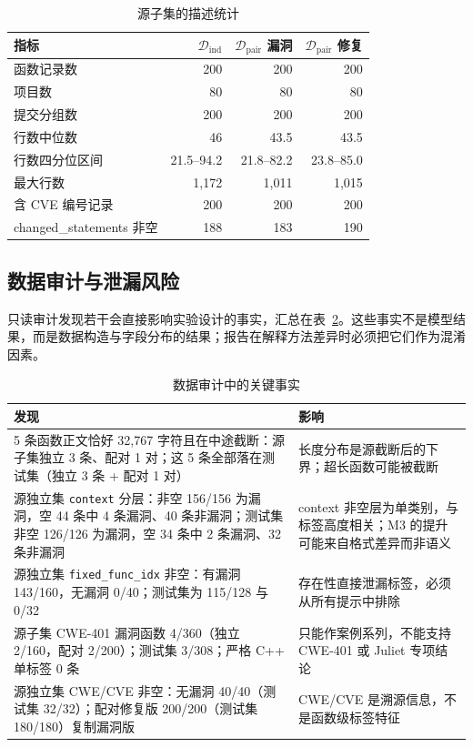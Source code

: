 \documentclass[conference]{IEEEtran}
\newcommand{\Dind}{\mathcal{D}_{\mathrm{ind}}}
\newcommand{\Dpair}{\mathcal{D}_{\mathrm{pair}}}
\begin{document}
\begin{table}[t]
\caption{源子集的描述统计}
\label{tab:data-stats}
\centering
\scriptsize
\begin{tabular}{@{}lrrr@{}}
\toprule
指标 & $\Dind$ & $\Dpair$ 漏洞 & $\Dpair$ 修复\\
\midrule
函数记录数 & 200 & 200 & 200\\
项目数 & 80 & 80 & 80\\
提交分组数 & 200 & 200 & 200\\
行数中位数 & 46 & 43.5 & 43.5\\
行数四分位区间 & 21.5--94.2 & 21.8--82.2 & 23.8--85.0\\
最大行数 & 1{,}172 & 1{,}011 & 1{,}015\\
含 CVE 编号记录 & 200 & 200 & 200\\
changed\_statements 非空 & 188 & 183 & 190\\
\bottomrule
\end{tabular}
\end{table}

\subsection{数据审计与泄漏风险}
只读审计发现若干会直接影响实验设计的事实，汇总在表~\ref{tab:audit}。这些事实不是模型结果，而是数据构造与字段分布的结果；报告在解释方法差异时必须把它们作为混淆因素。

\begin{table}[t]
\caption{数据审计中的关键事实}
\label{tab:audit}
\centering
\small
\begin{tabular}{@{}p{4.6cm}p{3.2cm}@{}}
\toprule
发现 & 影响\\
\midrule
5 条函数正文恰好 32{,}767 字符且在中途截断：源子集独立 3 条、配对 1 对；这 5 条全部落在测试集（独立 3 条 + 配对 1 对） & 长度分布是源截断后的下界；超长函数可能被截断 \\
源独立集 \texttt{context} 分层：非空 156/156 为漏洞，空 44 条中 4 条漏洞、40 条非漏洞；测试集非空 126/126 为漏洞，空 34 条中 2 条漏洞、32 条非漏洞 & context 非空层为单类别，与标签高度相关；M3 的提升可能来自格式差异而非语义 \\
源独立集 \texttt{fixed\_func\_idx} 非空：有漏洞 143/160，无漏洞 0/40；测试集为 115/128 与 0/32 & 存在性直接泄漏标签，必须从所有提示中排除 \\
源子集 CWE-401 漏洞函数 4/360（独立 2/160，配对 2/200）；测试集 3/308；严格 C++ 单标签 0 条 & 只能作案例系列，不能支持 CWE-401 或 Juliet 专项结论 \\
源独立集 CWE/CVE 非空：无漏洞 40/40（测试集 32/32）；配对修复版 200/200（测试集 180/180）复制漏洞版 & CWE/CVE 是溯源信息，不是函数级标签特征 \\
\bottomrule
\end{tabular}
\end{table}
\end{document}
